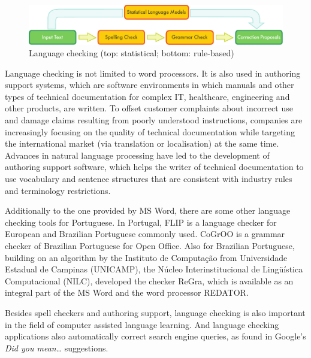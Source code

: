 \begin{multicols}{2}
\begin{figure}[htb]
  \center
  \includegraphics[width=\textwidth]{../_media/english/language_checking}
  \caption{Language checking (top: statistical; bottom: rule-based)}
  \label{fig:langcheckingaarch_en}
\end{figure}


Language checking is not limited to word processors. It is also used in authoring support systems, which are software environments in which manuals and other types of technical documentation for complex IT, healthcare, engineering and other products, are written. To offset customer complaints about incorrect use and damage claims resulting from poorly understood instructions, companies are increasingly focusing on the quality of technical documentation while targeting the international market (via translation or localisation) at the same time. Advances in natural language processing have led to the development of authoring support software, which helps the writer of technical documentation to use vocabulary and sentence structures that are consistent with industry rules and terminology restrictions.


Additionally to the one provided by MS Word, there are some other language checking tools for Portuguese. 
In Portugal, FLIP is a language checker for European and Brazilian Portuguese commonly used. 
CoGrOO is a grammar checker of Brazilian Portuguese for Open Office. Also for Brazilian Portuguese, 
building on an algorithm by the Instituto de Computação from Universidade Estadual de Campinas (UNICAMP), 
the Núcleo Interinstitucional de Lingüística Computacional (NILC), 
developed the checker ReGra, which is available as an integral part of the MS Word and the word processor REDATOR. 

Besides spell checkers and authoring support, language checking is also important in the field of computer assisted language learning. And language checking applications also automatically correct search engine queries, as found in Google's \textit{Did you mean}… suggestions.
\clearpage




\end{multicols}
